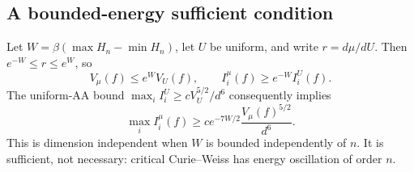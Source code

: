 \subsection{A bounded-energy sufficient condition}

Let $W=\beta(\max H_n-\min H_n)$, let $U$ be uniform, and write $r=d\mu/dU$. Then $e^{-W}\le r\le e^W$, so
\[
 V_\mu(f)\le e^WV_U(f),\qquad I_i^\mu(f)\ge e^{-W}I_i^U(f).
\]
The uniform-AA bound $\max_i I_i^U\ge cV_U^{5/2}/d^6$ consequently implies
\[
 \max_i I_i^\mu(f)\ge c e^{-7W/2}\frac{V_\mu(f)^{5/2}}{d^6}.
\]
This is dimension independent when $W$ is bounded independently of $n$. It is sufficient, not necessary: critical Curie--Weiss has energy oscillation of order $n$.
